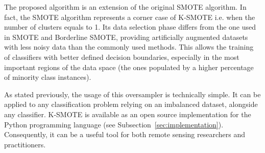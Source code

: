 \documentclass[parskip=full]{scrartcl}
\begin{document}
The proposed algorithm is an extension of the original SMOTE algorithm. In fact,
the SMOTE algorithm represents a corner case of K-SMOTE i.e. when the number of
clusters equals to 1. Its data selection phase differs from the one used in
SMOTE and Borderline SMOTE, providing artificially augmented datasets with less
noisy data than the commonly used methods. This allows the training of
classifiers with better defined decision boundaries, especially in the most
important regions of the data space (the ones populated by a higher percentage
of minority class instances).

As stated previously, the usage of this oversampler is technically simple. It
can be applied to any classification problem relying on an imbalanced dataset,
alongside any classifier. K-SMOTE is available as an open source implementation
for the Python programming language (see Subsection~\ref{sec:implementation}).
Consequently, it can be a useful tool for both remote sensing researchers and
practitioners.



\end{document}
